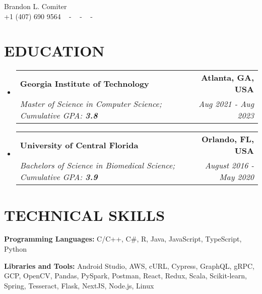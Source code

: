 \documentclass[letterpaper,11pt]{article}
\makeatletter
\newcommand{\resumeSubheading}[4]{
  \vspace{-2pt}\item
    \begin{tabular*}{1.0\textwidth}[t]{l@{\extracolsep{\fill}}r}
      \textbf{\large#1} & \textbf{\small #2} \\
      \textit{\large#3} & \textit{\small #4} \\
      
    \end{tabular*}\vspace{-7pt}
}
\newcommand{\resumeSubHeadingListStart}{\begin{itemize}[leftmargin=0.0in, label={}]}
\newcommand{\resumeSubHeadingListEnd}{\end{itemize}}
\makeatother
\begin{document}


\begin{center}

    {\huge Brandon L. Comiter} \\ \vspace{2pt} 
    {+1 (407) 690 9564} ~ 
    \small{-}
    \href{mailto:bcomiter@gmail.com}{\color{blue}{ bcomiter@gmail.com}} ~ 
    \small{-}
    \href{www.linkedin.com/in/brandon-comiter/}{\color{blue}{ linkedin.com/in/brandon-comiter}}  ~
    \small{-}
    \href{https://github.com/b-comiter}{\color{blue}{ github.com/b-comiter}} ~
    \vspace{-7pt}
\end{center}

\section{\color{catalinablue}EDUCATION}
  \resumeSubHeadingListStart
    \resumeSubheading
      {Georgia Institute of Technology}{Atlanta, GA, USA}
      {Master of Science in Computer Science; Cumulative GPA: \textbf{3.8}}{Aug 2021 - Aug 2023}
    \vspace{0pt}
    
    \resumeSubheading
      {University of Central Florida}{Orlando, FL, USA}
      {Bachelors of Science in Biomedical Science; Cumulative GPA: \textbf{3.9}}{August 2016 - May 2020}
      
  \resumeSubHeadingListEnd
  \vspace{-20pt}

\section{\color{catalinablue}TECHNICAL SKILLS}
 \begin{itemize}[leftmargin=0in, label={}]
    \small{\item{
     \textbf{\normalsize{Programming Languages:}}{ \normalsize{C/C++, C\#, R, Java, JavaScript, TypeScript, Python}} \\
      \vspace{1.2pt}
      
     \textbf{\normalsize{Libraries and Tools:}}{ \normalsize{Android Studio, AWS, cURL, Cypress, GraphQL, gRPC, GCP, OpenCV, Pandas, PySpark, Postman, React, Redux, Scala, Scikit-learn, Spring, Tesseract, Flask, NextJS, Node.js, Linux}} \\
      \vspace{1.2pt}
      
     }}
 \end{itemize}
 \vspace{-16pt}
 
\end{document}

